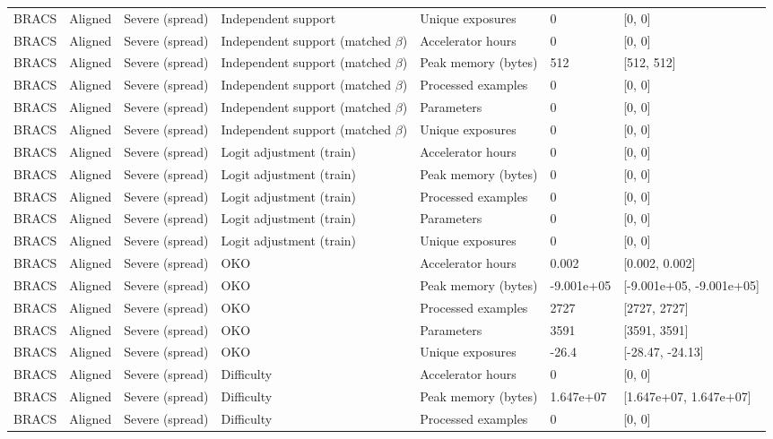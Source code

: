 \begin{longtable}{lllllll}
BRACS & Aligned & Severe (spread) & Independent support & Unique exposures & 0 & [0, 0] \\
BRACS & Aligned & Severe (spread) & Independent support (matched $\beta$) & Accelerator hours & 0 & [0, 0] \\
BRACS & Aligned & Severe (spread) & Independent support (matched $\beta$) & Peak memory (bytes) & 512 & [512, 512] \\
BRACS & Aligned & Severe (spread) & Independent support (matched $\beta$) & Processed examples & 0 & [0, 0] \\
BRACS & Aligned & Severe (spread) & Independent support (matched $\beta$) & Parameters & 0 & [0, 0] \\
BRACS & Aligned & Severe (spread) & Independent support (matched $\beta$) & Unique exposures & 0 & [0, 0] \\
BRACS & Aligned & Severe (spread) & Logit adjustment (train) & Accelerator hours & 0 & [0, 0] \\
BRACS & Aligned & Severe (spread) & Logit adjustment (train) & Peak memory (bytes) & 0 & [0, 0] \\
BRACS & Aligned & Severe (spread) & Logit adjustment (train) & Processed examples & 0 & [0, 0] \\
BRACS & Aligned & Severe (spread) & Logit adjustment (train) & Parameters & 0 & [0, 0] \\
BRACS & Aligned & Severe (spread) & Logit adjustment (train) & Unique exposures & 0 & [0, 0] \\
BRACS & Aligned & Severe (spread) & OKO & Accelerator hours & 0.002 & [0.002, 0.002] \\
BRACS & Aligned & Severe (spread) & OKO & Peak memory (bytes) & -9.001e+05 & [-9.001e+05, -9.001e+05] \\
BRACS & Aligned & Severe (spread) & OKO & Processed examples & 2727 & [2727, 2727] \\
BRACS & Aligned & Severe (spread) & OKO & Parameters & 3591 & [3591, 3591] \\
BRACS & Aligned & Severe (spread) & OKO & Unique exposures & -26.4 & [-28.47, -24.13] \\
BRACS & Aligned & Severe (spread) & Difficulty & Accelerator hours & 0 & [0, 0] \\
BRACS & Aligned & Severe (spread) & Difficulty & Peak memory (bytes) & 1.647e+07 & [1.647e+07, 1.647e+07] \\
BRACS & Aligned & Severe (spread) & Difficulty & Processed examples & 0 & [0, 0] \\

\end{longtable}
